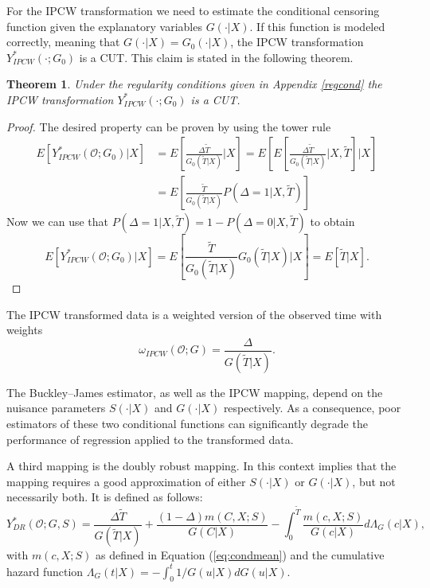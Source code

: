 \documentclass[12pt, a4paper]{scrartcl}
\theoremstyle{definition}
\theoremstyle{plain}
\newtheorem{Theorem}{Theorem}[section]
\numberwithin{equation}{section}
\numberwithin{figure}{section}
\numberwithin{table}{section}
\begin{document}
	For the IPCW transformation we need to estimate the conditional censoring function given the explanatory variables $G(\cdot\vert X)$.
	If this function is modeled correctly, meaning that $G(\cdot\vert X)=G_0(\cdot\vert X)$, the IPCW transformation $Y_{IPCW}^*(\cdot; G_0)$ is a CUT.
	This claim is stated in the following theorem.
	\begin{Theorem}
		Under the regularity conditions given in Appendix \ref{regcond} the IPCW transformation $Y_{IPCW}^*(\cdot; G_0)$ is a CUT.
	\end{Theorem}
	\begin{proof}
		The desired property can be proven by using the tower rule
		\begin{equation*}
		\begin{split}
		E\left[Y_{IPCW}^*(\mathcal{O}; G_0)\vert X\right] &={} E\left[\frac{\Delta \tilde T}{G_0(\tilde T\vert X)}\vert X\right] = E\left[E\left[\frac{\Delta \tilde T}{G_0(\tilde T\vert X)}\vert X, \tilde T\right]\vert X\right]\\
		&={} E\left[\frac{\tilde T}{G_0(\tilde T \vert X)}P(\Delta = 1 \vert X, \tilde T)\right]
		\end{split}
		\end{equation*}
		Now we can use that $P(\Delta = 1\vert X, \tilde T) = 1-P(\Delta = 0\vert X, \tilde T)$ to obtain
		\begin{equation*}
		E\left[Y_{IPCW}^*(\mathcal{O}; G_0)\vert X\right] = E\left[\frac{\tilde T}{G_0(\tilde T \vert X)}G_0(\tilde T \vert X)\vert X\right] = E[\tilde T \vert X].
		\end{equation*}
		
	\end{proof}
		
	The IPCW transformed data is a weighted version of the observed time with weights
	\begin{equation}\label{eq:ipcw}
	\omega_{IPCW}(\mathcal{O}; G) = \frac{\Delta}{G(\tilde T \vert X)}.
	\end{equation}

	The Buckley--James estimator, as well as the IPCW mapping, depend on the nuisance parameters $S(\cdot\vert X)$ and $G(\cdot\vert X)$ respectively.
	As a consequence, poor estimators of these two conditional functions can significantly degrade the performance of regression applied to the transformed data.
	
	A third mapping is the doubly robust mapping.
	In this context  implies that the mapping requires a good approximation of either  $S(\cdot\vert X)$ or $G(\cdot\vert X)$, but not necessarily both.
	It is defined as follows:
	\begin{equation}\label{eq:drcut}
	Y_{DR}^* (\mathcal{O}; G, S) = \frac{\Delta \tilde T}{G(\tilde T\vert X)} + \frac{(1-\Delta)m(C,X;S)}{G(C \vert X)} - \int_{0}^{\tilde T} \frac{m(c,X;S)}{G(c \vert X)} d\Lambda_G(c \vert X),
	\end{equation}
	with $m(c,X;S)$ as defined in Equation (\ref{eq:condmean}) and the cumulative hazard function $\Lambda_G(t\vert X)=-\int_{0}^{t}1/G(u\vert X)dG(u\vert X)$.
	
\end{document}
